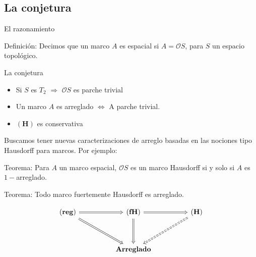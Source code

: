 \documentclass[compress,12pt]{beamer}
\begin{document}
\subsection{La conjetura}
\begin{frame}{El razonamiento}
	\begin{block}{Definición:}
		Decimos que un marco $A$ es espacial si $A=\mathcal{O}S$, para $S$ un espacio topológico.
	\end{block}
	


\end{frame}

\begin{frame}{La conjetura}

		\begin{itemize}
			\item Si $S$ es $T_2$ $\Rightarrow$ $\mathcal{O}S$ es parche trivial
			\item<2-> Un marco $A$ es arreglado $\Leftrightarrow$ A parche trivial.
			\item<3-> $\mathbf{(H)}$ es conservativa
		\end{itemize}
	
	
\end{frame}

\begin{frame}
    Buscamos tener nuevas caracterizaciones de arreglo basadas en las nociones tipo Hausdorff para marcos. Por ejemplo:

\begin{block}{Teorema:}
        Para $A$ un marco espacial, $\mathcal{O}S$ es un marco Hausdorff si y solo si $A$ es $1-$arreglado.
    \end{block}

\begin{block}{Teorema:}
    Todo marco fuertemente Hausdorff es arreglado.
\end{block}

\[\begin{tikzcd}
	{\mathbf{(reg)}} && {\mathbf{(fH)}} && {\mathbf{(H)}} \\
	\\
	&& {\mathbf{Arreglado}}
	\arrow[Rightarrow, from=1-1, to=1-3]
	\arrow[Rightarrow, from=1-1, to=3-3]
	\arrow[Rightarrow, from=1-3, to=1-5]
	\arrow[Rightarrow, from=1-3, to=3-3]
	\arrow[Rightarrow, dashed, from=1-5, to=3-3]
\end{tikzcd}\]
\end{frame}
\end{document}
